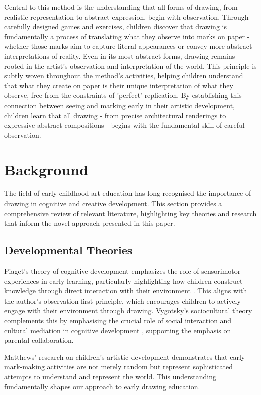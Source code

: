 \documentclass{article}
\begin{document}
Central to this method is the understanding that all forms of drawing, from realistic representation to abstract expression, begin with observation. Through carefully designed games and exercises, children discover that drawing is fundamentally a process of translating what they observe into marks on paper - whether those marks aim to capture literal appearances or convey more abstract interpretations of reality. Even in its most abstract forms, drawing remains rooted in the artist's observation and interpretation of the world. This principle is subtly woven throughout the method's activities, helping children understand that what they create on paper is their unique interpretation of what they observe, free from the constraints of 'perfect' replication. By establishing this connection between seeing and marking early in their artistic development, children learn that all drawing - from precise architectural renderings to expressive abstract compositions - begins with the fundamental skill of careful observation.

\section{Background}
\label{sec:background}

The field of early childhood art education has long recognised the importance of drawing in cognitive and creative development. This section provides a comprehensive review of relevant literature, highlighting key theories and research that inform the novel approach presented in this paper.

\subsection{Developmental Theories}

Piaget's theory of cognitive development emphasizes the role of sensorimotor experiences in early learning, particularly highlighting how children construct knowledge through direct interaction with their environment \cite{piaget1969psychology}. This aligns with the author's observation-first principle, which encourages children to actively engage with their environment through drawing. Vygotsky's sociocultural theory complements this by emphasising the crucial role of social interaction and cultural mediation in cognitive development \cite{2vygotsky1978mind}, supporting the emphasis on parental collaboration.

Matthews' research on children's artistic development \cite{3matthews2003drawing} demonstrates that early mark-making activities are not merely random but represent sophisticated attempts to understand and represent the world. This understanding fundamentally shapes our approach to early drawing education.
\end{document}

